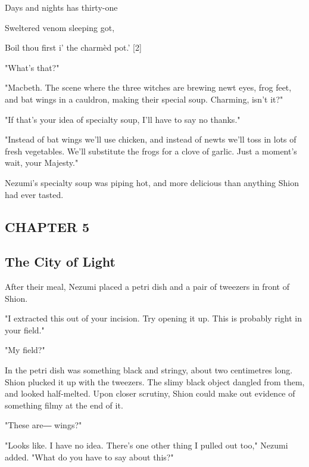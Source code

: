 Days and nights has thirty-one

Sweltered venom sleeping got,

Boil thou first i' the charmèd pot.' {[}2{]}

"What's that?"

"Macbeth. The scene where the three witches are brewing newt eyes, frog
feet, and bat wings in a cauldron, making their special soup. Charming,
isn't it?"

"If that's your idea of specialty soup, I'll have to say no thanks."

"Instead of bat wings we'll use chicken, and instead of newts we'll toss
in lots of fresh vegetables. We'll substitute the frogs for a clove of
garlic. Just a moment's wait, your Majesty."

Nezumi's specialty soup was piping hot, and more delicious than anything
Shion had ever tasted.

\hypertarget{index_split_083.htmlux5cux23calibre_pb_114}{}

\protect\hypertarget{index_split_111.html}{}{}

\hypertarget{index_split_111.htmlux5cux23calibre_pb_0}{}

\hypertarget{index_split_111.htmlux5cux23calibre_toc_6}{%
\subsection{CHAPTER 5}\label{index_split_111.htmlux5cux23calibre_toc_6}}

\subsection{The City of Light}

After their meal, Nezumi placed a petri dish and a pair of tweezers in
front of Shion.

"I extracted this out of your incision. Try opening it up. This is
probably right in your field."

"My field?"

In the petri dish was something black and stringy, about two centimetres
long. Shion plucked it up with the tweezers. The slimy black object
dangled from them, and looked half-melted. Upon closer scrutiny, Shion
could make out evidence of something filmy at the end of it.

"These are― wings?"

"Looks like. I have no idea. There's one other thing I pulled out too,"
Nezumi added. "What do you have to say about this?"

